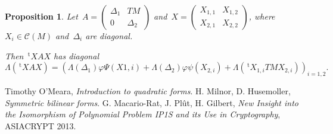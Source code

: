 \documentclass{article}%
\newtheorem{prop}{Proposition}
\let\ro\mathscr
\def\transpose{\,{}^{\mathrm{t}\!}}
\def\mat#1{\begin{pmatrix}#1\end{pmatrix}}
\begin{document}
\begin{prop}
Let~$A = \mat{Δ_1 & TM \\ 0 & Δ_2}$ and~$X = \mat{X_{1,1} & X_{1,2}\\
X_{2,1} & X_{2,2}}$, where~$X_i ∈ \ro C(M)$ and~$Δ_i$ are diagonal.

Then $\transpose{X} A X$ has diagonal
\[ Λ(\transpose{X} A X) = ( Λ(Δ_1) φΨ(X{1,i}) + Λ(Δ_2) φψ(X_{2,i}) +
  Λ(\transpose{X_{1,i}} TM X_{2,i}))_{i=1,2}. \]
\end{prop}

\begin{thebibliography}{99}%
 Timothy O'Meara, \emph{Introduction to quadratic forms}.
 H. Milnor, D. Husemoller, \emph{Symmetric
bilinear forms}.
 G. Macario-Rat, J. Plût, H. Gilbert,
\emph{New Insight into the Isomorphism of Polynomial Problem IP1S
 and its Use in Cryptography}, ASIACRYPT 2013.
\end{thebibliography}%
\end{document}
